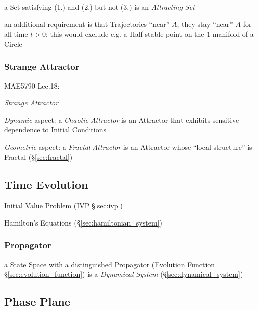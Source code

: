 a Set satisfying (1.) and (2.) but not (3.) is an \emph{Attracting Set}

an additional requirement is that Trajectories ``near'' $A$, they stay ``near''
$A$ for all time $t > 0$; this would exclude e.g. a Half-stable point on the
$1$-manifold of a Circle



\subsubsection{Strange Attractor}\label{sec:strange_attractor}

MAE5790 Lec.18:

\emph{Strange Attractor}

\emph{Dynamic} aspect: a \emph{Chaotic Attractor} is an Attractor that exhibits
sensitive dependence to Initial Conditions

\emph{Geometric} aspect: a \emph{Fractal Attractor} is an Attractor whose
``local structure'' is Fractal (\S\ref{sec:fractal})



\subsection{Time Evolution}\label{sec:time_evolution}

\fist Initial Value Problem (IVP \S\ref{sec:ivp})

Hamilton's Equations (\S\ref{sec:hamiltonian_system})



\subsubsection{Propagator}\label{sec:propagator}

a State Space with a distinguished Propagator (Evolution Function
\S\ref{sec:evolution_function}) is a \emph{Dynamical System}
(\S\ref{sec:dynamical_system})



\subsection{Phase Plane}\label{sec:phase_plane}

